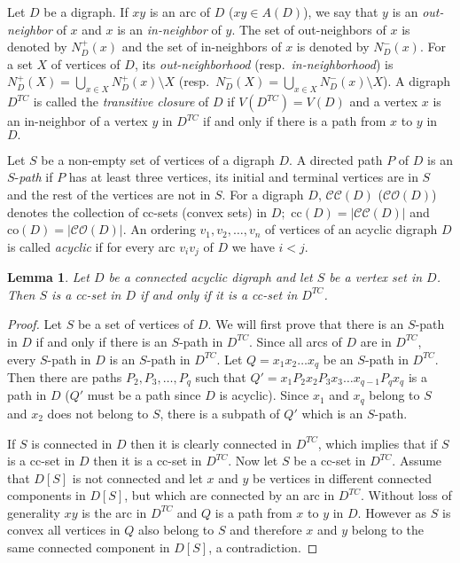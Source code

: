 \documentclass[11pt]{article}
\newcommand{\2}{\vspace{0.2 cm}}
\newtheorem{lemma}[theorem]{Lemma}
\newcommand\co{\mathrm{co}}
\newcommand\sco{\mathcal{CO}}
\newcommand\cc{\mathrm{cc}}
\newcommand\scc{\mathcal{CC}}
\begin{document}
Let $D$ be a digraph. If $xy$ is an arc of $D$ ($xy\in A(D)$), we
say that $y$ is an {\em out-neighbor} of $x$ and $x$ is an {\em
in-neighbor} of $y$. The set of out-neighbors of $x$ is denoted by
$N^+_D(x)$ and the set of in-neighbors of $x$ is denoted by
$N^-_D(x)$. For a set $X$ of vertices of $D$, its {\em
out-neighborhood} (resp.\ {\em in-neighborhood}) is $N^+_D(X)=\bigcup_{x\in
X}N^+_D(x)\setminus X$ (resp.\ $N^-_D(X)=\bigcup_{x\in X}N^-_D(x)\setminus
X$). A digraph $D^{TC}$ is called the {\em transitive closure} of
$D$ if $V(D^{TC})=V(D)$ and a vertex $x$ is an in-neighbor of a
vertex $y$ in $D^{TC}$ if and only if there is a path from $x$ to
$y$ in $D.$

Let $S$ be a non-empty set of vertices of a digraph $D$. A directed
path $P$ of $D$ is an $S$-{\em path} if $P$ has at least three
vertices, its initial and terminal vertices are in $S$ and the rest
of the vertices are not in $S.$  For a digraph $D$, $\scc(D)$
($\sco(D)$) denotes the collection of cc-sets (convex sets) in $D;$
$\cc(D)=|\scc(D)|$ and $\co(D)=|\sco(D)|.$ An ordering
$v_1,v_2,\ldots, v_n$ of vertices of an acyclic digraph $D$ is
called {\em acyclic} if for every arc $v_i v_j$ of $D$ we have
$i<j$.


\begin{lemma} \label{lemma_transitive}
Let $D$ be a connected acyclic digraph and let $S$ be a vertex set
in $D$. Then $S$ is a cc-set in $D$ if and only if it is a cc-set in
$D^{TC}$.
\end{lemma}
\begin{proof} Let $S$ be a set of vertices of $D$. We will first prove that
there is an $S$-path in $D$ if and only if there is an $S$-path in
$D^{TC}.$ Since all arcs of $D$ are in $D^{TC}$, every $S$-path in
$D$ is an $S$-path in $D^{TC}.$ Let $Q=x_1x_2\ldots x_q$ be an
$S$-path in $D^{TC}$. Then there are paths $P_2,P_3,\ldots ,P_q$
such that $Q'=x_1P_2x_2P_3x_3\ldots x_{q-1}P_qx_q$ is a path in $D$
($Q'$ must be a path since $D$ is acyclic). Since $x_1$ and $x_q$
belong to $S$ and $x_2$ does not belong to $S$, there is a subpath
of $Q'$ which is an $S$-path.

If $S$ is connected in $D$ then it is clearly connected in $D^{TC}$,
which implies that if $S$ is a cc-set in $D$ then it is a cc-set in
$D^{TC}$. Now let $S$ be a cc-set in $D^{TC}$. Assume that $D[S]$ is
not connected and let $x$ and $y$ be vertices in different connected
components in $D[S]$, but which are connected by an arc in $D^{TC}$.
Without loss of generality $xy$ is the arc in $D^{TC}$ and $Q$ is a
path from $x$ to $y$ in $D$. However as $S$ is convex all vertices
in $Q$ also belong to $S$ and therefore $x$ and $y$ belong to the
same connected component in $D[S]$, a contradiction. \end{proof}
\end{document}
